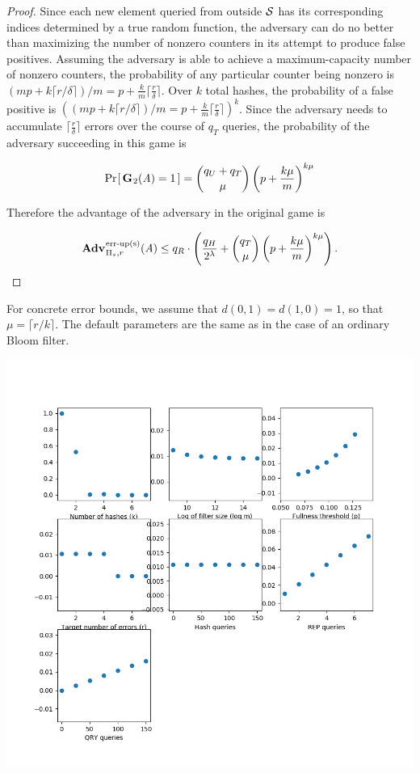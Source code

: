 \begin{proof}
Since each new element queried from outside $\mathcal{S}$ has its corresponding indices determined by a true random function, the adversary can do no better than maximizing the number of nonzero counters in its attempt to produce false positives. Assuming the adversary is able to achieve a maximum-capacity number of nonzero counters, the probability of any particular counter being nonzero is $(mp + k\lceil r/\delta \rceil)/m = p + \frac{k}{m}\lceil\frac{r}{\delta}\rceil$. Over $k$ total hashes, the probability of a false positive is $\left((mp + k\lceil r/\delta \rceil)/m = p + \frac{k}{m}\lceil\frac{r}{\delta}\rceil\right)^k$. Since the adversary needs to accumulate $\lceil\frac{r}{\delta}\rceil$ errors over the course of $q_T$ queries, the probability of the adversary succeeding in this game is

$$\Pr\hspace{-1pt}\left[\,\mathbf{G}\hspace{0.5pt}_2(\mathit{A}) = 1\,\right] = \binom{q_U + q_T}{\mu}\left(p+\frac{k\mu}{m}\right)^{k\mu}$$

Therefore the advantage of the adversary in the original game is

$$\Adv{\erreps}_{\struct_s,r}(\advA) \le q_R \cdot \left(\frac{q_H}{2^\lambda} + \binom{q_T}{\mu}\left(p+\frac{k\mu}{m}\right)^{k\mu}\right).$$\missingqed

\end{proof}

For concrete error bounds, we assume that $d(0,1) = d(1,0) = 1$, so that $\mu = \lceil r/k \rceil$. The default parameters are the same as in the case of an ordinary Bloom filter.

\includegraphics[scale=0.75]{CBF_Fig}

